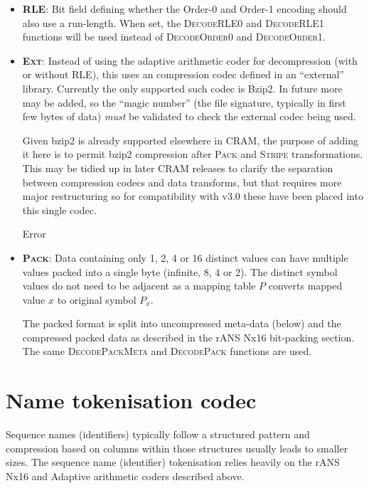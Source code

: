 \documentclass[a4paper]{article}
\begin{document}
\begin{itemize}
\item{\textbf{\textsc{RLE}}:}
Bit field defining whether the Order-0 and Order-1 encoding should also use a run-length.
When set, the \textsc{DecodeRLE0} and \textsc{DecodeRLE1} functions will be used instead of \textsc{DecodeOrder0} and \textsc{DecodeOrder1}.

\item{\textbf{\textsc{Ext}}:}
Instead of using the adaptive arithmetic coder for decompression (with or without RLE), this uses an compression codec defined in an ``external'' library.
Currently the only supported such codec is Bzip2.
In future more may be added, so the ``magic number'' (the file signature, typically in first few bytes of data) \emph{must} be validated to check the external codec being used.

Given bzip2 is already supported elsewhere in CRAM, the purpose of adding it here is to permit bzip2 compression after \textsc{Pack} and \textsc{Stripe} transformations.
This may be tidied up in later CRAM releases to clarify the separation between compression codecs and data transforms, but that requires more major restructuring so for compatibility with v3.0 these have been placed into this single codec.

\begin{algorithmic}[1]
    \State \Return {}
  \Else
    \State Error
  \EndIf
\EndFunction
\end{algorithmic}

\item{\textbf{\textsc{Pack}}:}
Data containing only 1, 2, 4 or 16 distinct values can have multiple
values packed into a single byte (infinite, 8, 4 or 2).  The distinct
symbol values do not need to be adjacent as a mapping table $P$
converts mapped value $x$ to original symbol $P_x$.

The packed format is split into uncompressed meta-data (below) and the
compressed packed data as described in the rANS Nx16 bit-packing section.
The same \textsc{DecodePackMeta} and \textsc{DecodePack} functions are used.

\end{itemize}

\section{Name tokenisation codec}

Sequence names (identifiers) typically follow a structured pattern and compression based on columns within those structures usually leads to smaller sizes.
The sequence name (identifier) tokenisation relies heavily on the rANS Nx16 and Adaptive arithmetic coders described above.
\end{document}
